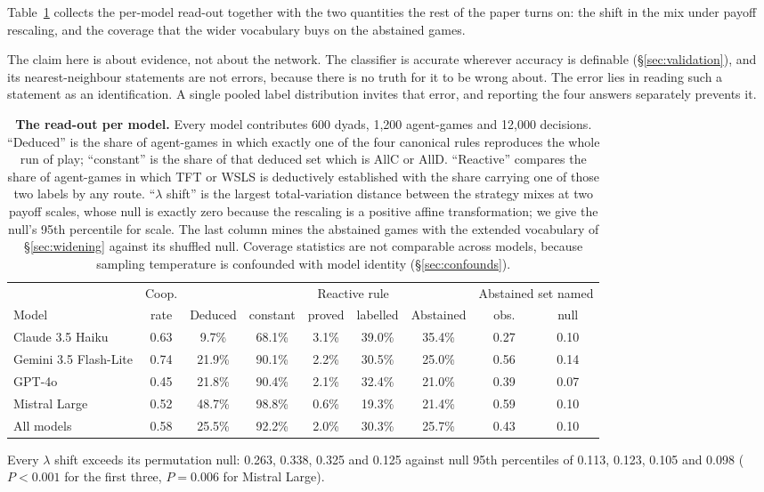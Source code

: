 \documentclass[11pt,a4paper]{article}
\newcommand{\lam}{\lambda}
\begin{document}
Table~\ref{tab:profile} collects the per-model read-out together with the two
quantities the rest of the paper turns on: the shift in the mix under payoff
rescaling, and the coverage that the wider vocabulary buys on the abstained
games.

The claim here is about evidence, not about the network. The classifier is
accurate wherever accuracy is definable (\S\ref{sec:validation}), and its
nearest-neighbour statements are not errors, because there is no truth for it
to be wrong about. The error lies in reading such a statement as an
identification. A single pooled label distribution invites that error, and
reporting the four answers separately prevents it.

\begin{table}[t]
\centering
\footnotesize
\setlength{\tabcolsep}{4.5pt}
\caption{\textbf{The read-out per model.} Every model contributes 600 dyads,
1{,}200 agent-games and 12{,}000 decisions. ``Deduced'' is the share of
agent-games in which exactly one of the four canonical rules reproduces the whole
run of play; ``constant'' is the share of that deduced set which is AllC or
AllD. ``Reactive'' compares the share of agent-games in which TFT or WSLS is
deductively established with the share carrying one of those two labels by any
route. ``$\lam$ shift'' is the largest total-variation distance between the
strategy mixes at two payoff scales, whose null is exactly zero because the
rescaling is a positive affine transformation; we give the null's 95th
percentile for scale. The last column mines the abstained games with the extended
vocabulary of \S\ref{sec:widening} against its shuffled null. Coverage
statistics are not comparable across models, because sampling temperature is
confounded with model identity (\S\ref{sec:confounds}).}
\label{tab:profile}
\begin{tabular}{@{}lcccccccc@{}}
\toprule
 & Coop. & & & \multicolumn{2}{c}{Reactive rule} & & \multicolumn{2}{c}{Abstained set named} \\
\cmidrule(lr){5-6}\cmidrule(lr){8-9}
Model & rate & Deduced & constant & proved & labelled & Abstained & obs. & null \\
\midrule
Claude 3.5 Haiku      & 0.63 & 9.7\%  & 68.1\% & 3.1\% & 39.0\% & 35.4\% & 0.27 & 0.10 \\
Gemini 3.5 Flash-Lite & 0.74 & 21.9\% & 90.1\% & 2.2\% & 30.5\% & 25.0\% & 0.56 & 0.14 \\
GPT-4o                & 0.45 & 21.8\% & 90.4\% & 2.1\% & 32.4\% & 21.0\% & 0.39 & 0.07 \\
Mistral Large         & 0.52 & 48.7\% & 98.8\% & 0.6\% & 19.3\% & 21.4\% & 0.59 & 0.10 \\
\midrule
All models            & 0.58 & 25.5\% & 92.2\% & 2.0\% & 30.3\% & 25.7\% & 0.43 & 0.10 \\
\bottomrule
\end{tabular}

\vspace{2pt}
{\footnotesize Every $\lam$ shift exceeds its permutation null: 0.263, 0.338,
0.325 and 0.125 against null 95th percentiles of 0.113, 0.123, 0.105 and 0.098
($P < 0.001$ for the first three, $P = 0.006$ for Mistral Large).}
\end{table}
\end{document}
